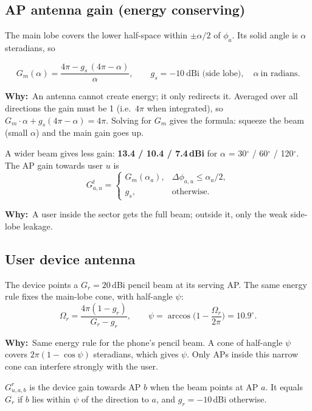 \documentclass[11pt,a4paper]{article}
\newcommand{\why}[1]{\par\smallskip\noindent\begin{minipage}{\linewidth}\small
  \textcolor{whyc}{\textbf{Why:}}~#1\end{minipage}\par\medskip}
\begin{document}
\subsection{AP antenna gain (energy conserving)}
The main lobe covers the lower half-space within $\pm\alpha/2$ of $\phi_a$. Its solid angle is
$\alpha$ steradians, so
\begin{keybox}[AP gain]
\[
G_m(\alpha)=\frac{4\pi-g_s\,(4\pi-\alpha)}{\alpha},
\qquad g_s=-10\ \text{dBi (side lobe)},\quad \alpha\ \text{in radians}.
\]
\end{keybox}
\why{An antenna cannot create energy; it only redirects it. Averaged over all directions the gain must be 1 (i.e.\ $4\pi$ when integrated), so $G_m\cdot\alpha + g_s(4\pi-\alpha)=4\pi$. Solving for $G_m$ gives the formula: squeeze the beam (small $\alpha$) and the main gain goes up.}
A wider beam gives less gain: \textbf{13.4 / 10.4 / 7.4\,dBi} for $\alpha$ = 30$^\circ$ / 60$^\circ$ / 120$^\circ$.
The AP gain towards user $u$ is
\[
G^{t}_{a,u}=
\begin{cases}
G_m(\alpha_a), & \Delta\phi_{a,u}\le\alpha_a/2,\\[2pt]
g_s, & \text{otherwise.}
\end{cases}
\]
\why{A user inside the sector gets the full beam; outside it, only the weak side-lobe leakage.}

\subsection{User device antenna}
The device points a $G_r=20$\,dBi pencil beam at its serving AP. The same energy rule fixes
the main-lobe cone, with half-angle $\psi$:
\[
\Omega_r=\frac{4\pi(1-g_r)}{G_r-g_r},
\qquad
\psi=\arccos\!\Big(1-\frac{\Omega_r}{2\pi}\Big)=10.9^\circ .
\]
\why{Same energy rule for the phone's pencil beam. A cone of half-angle $\psi$ covers $2\pi(1-\cos\psi)$ steradians, which gives $\psi$. Only APs inside this narrow cone can interfere strongly with the user.}
$G^{r}_{u,a,b}$ is the device gain towards AP $b$ when the beam points at AP $a$. It equals
$G_r$ if $b$ lies within $\psi$ of the direction to $a$, and $g_r=-10$\,dBi otherwise.
\end{document}
